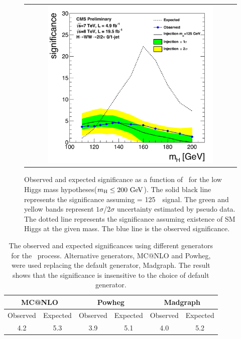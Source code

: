 %
\begin{figure}[htp] 
\centering 
\begin{tabular}{c} 
\includegraphics[width=0.8\textwidth]{figures/signif_allcomb_inj125_data_zoom.pdf} 
\end{tabular} 
\caption{Observed and expected significance as a function of \mHi\ for 
the low Higgs mass hypotheses($m_{\mathrm{H}}\le200~\mathrm{Ge\kern -0.1em V}$). 
The solid black line represents the significance assuming \mHi = 125~\GeV\ signal. 
The green and yellow bands represent $1\sigma$/$2\sigma$ uncertainty 
estimated by pseudo data. The dotted line represents the significance 
assuming existence of SM Higgs at the given mass. 
The blue line is the observed significance. 
} 
\label{fig:significane_mH} 
\end{figure} 

%
\begin{table}[htp] 
\begin{center} 
\label{tab:sig_diffgenerator} 
\vspace{0.5cm} 
\caption{The observed and expected significances
using different generators for the \qqww\ process. Alternative generators,
MC@NLO and Powheg, were used replacing the default generator, Madgraph.
The result shows that the significance is insensitive to the choice
of default generator.} 
\vspace{0.5cm} 
\begin{tabular}{cc|cc|cc} 
\hline 
\multicolumn{2}{c|}{MC@NLO}   &  \multicolumn{2}{c|}{Powheg} & \multicolumn{2}{c}{Madgraph} \\
\hline \hline 
Observed & Expected & Observed & Expected &  Observed & Expected \\ 
\hline 
4.2 & 5.3 & 3.9 & 5.1 & 4.0 & 5.2 \\
\hline 
\end{tabular} 
\end{center} 
\end{table} 


